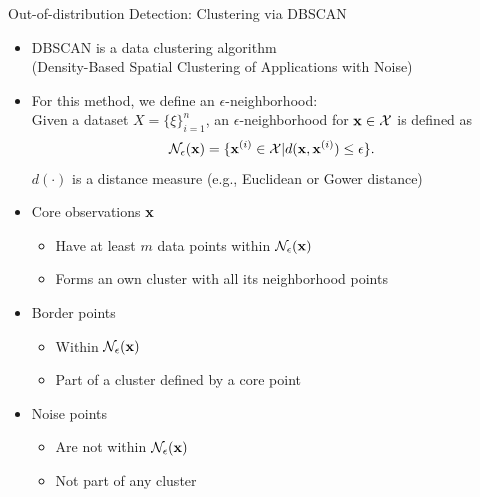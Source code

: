 \documentclass[11pt,compress,t,notes=noshow, aspectratio=169, xcolor=table]{beamer}
\begin{document}
\begin{frame}[c]{Out-of-distribution Detection: Clustering via DBSCAN}
\begin{itemize}
	\item DBSCAN is a data clustering algorithm \\ (Density-Based Spatial Clustering of Applications with Noise) 
	\pause
	\item For this method, we define an $\epsilon$-neighborhood: \\
	Given a dataset $X = \{\xi\}_{i = 1}^n$, an $\epsilon$-neighborhood for $\mathbf{x} \in \mathcal{X}$ is defined as 
	$$ \mathcal{N}_{\epsilon}(\mathbf{x}) = \{\mathbf{x}^{(i)} \in \mathcal{X} | d(\mathbf{x}, \mathbf{x}^{(i)}) \le \epsilon\}.$$
	 $d(\cdot)$ is a distance measure (e.g., Euclidean or Gower distance) 
	 \pause
	\item Core observations $\mathbf{x}$
	\begin{itemize}
	    \item Have at least $m$ data points within $\mathcal{N}_{\epsilon}(\mathbf{x})$
	    \item Forms an own cluster with all its neighborhood points
	\end{itemize}
	\pause
    \item Border points
    \begin{itemize}
        \item Within $\mathcal{N}_{\epsilon}(\mathbf{x})$
        \item Part of a cluster defined by a core point
    \end{itemize}
    \pause
    \item Noise points
    \begin{itemize}
        \item Are not within $\mathcal{N}_{\epsilon}(\mathbf{x})$
        \item Not part of any cluster
    \end{itemize}
\end{itemize}
\end{frame}
\end{document}
